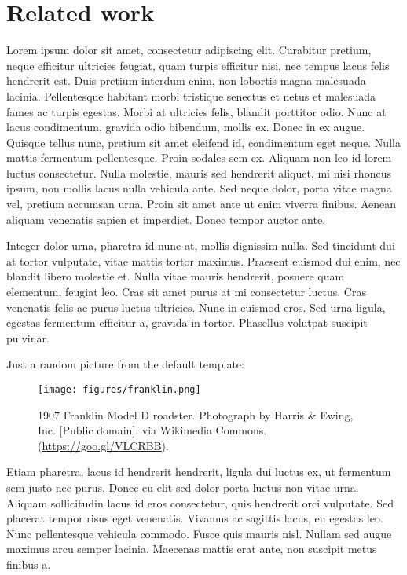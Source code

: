 \section{Related work}
Lorem ipsum dolor sit amet, consectetur adipiscing elit. Curabitur pretium, neque efficitur ultricies feugiat, quam turpis efficitur nisi, nec tempus lacus felis hendrerit est. Duis pretium interdum enim, non lobortis magna malesuada lacinia. Pellentesque habitant morbi tristique senectus et netus et malesuada fames ac turpis egestas. Morbi at ultricies felis, blandit porttitor odio. Nunc at lacus condimentum, gravida odio bibendum, mollis ex. Donec in ex augue. Quisque tellus nunc, pretium sit amet eleifend id, condimentum eget neque. Nulla mattis fermentum pellentesque. Proin sodales sem ex. Aliquam non leo id lorem luctus consectetur. Nulla molestie, mauris sed hendrerit aliquet, mi nisi rhoncus ipsum, non mollis lacus nulla vehicula ante. Sed neque dolor, porta vitae magna vel, pretium accumsan urna. Proin sit amet ante ut enim viverra finibus. Aenean aliquam venenatis sapien et imperdiet. Donec tempor auctor ante.

Integer dolor urna, pharetra id nunc at, mollis dignissim nulla. Sed tincidunt dui at tortor vulputate, vitae mattis tortor maximus. Praesent euismod dui enim, nec blandit libero molestie et. Nulla vitae mauris hendrerit, posuere quam elementum, feugiat leo. Cras sit amet purus at mi consectetur luctus. Cras venenatis felis ac purus luctus ultricies. Nunc in euismod eros. Sed urna ligula, egestas fermentum efficitur a, gravida in tortor. Phasellus volutpat suscipit pulvinar.

Just a random picture from the default template:
\begin{figure}[h]
    \centering
    \texttt{[image: figures/franklin.png]}
    \caption{1907 Franklin Model D roadster. Photograph by Harris \&
      Ewing, Inc. [Public domain], via Wikimedia
      Commons. (\url{https://goo.gl/VLCRBB}).}
  \end{figure}
  

Etiam pharetra, lacus id hendrerit hendrerit, ligula dui luctus ex, ut fermentum sem justo nec purus. Donec eu elit sed dolor porta luctus non vitae urna. Aliquam sollicitudin lacus id eros consectetur, quis hendrerit orci vulputate. Sed placerat tempor risus eget venenatis. Vivamus ac sagittis lacus, eu egestas leo. Nunc pellentesque vehicula commodo. Fusce quis mauris nisl. Nullam sed augue maximus arcu semper lacinia. Maecenas mattis erat ante, non suscipit metus finibus a. 